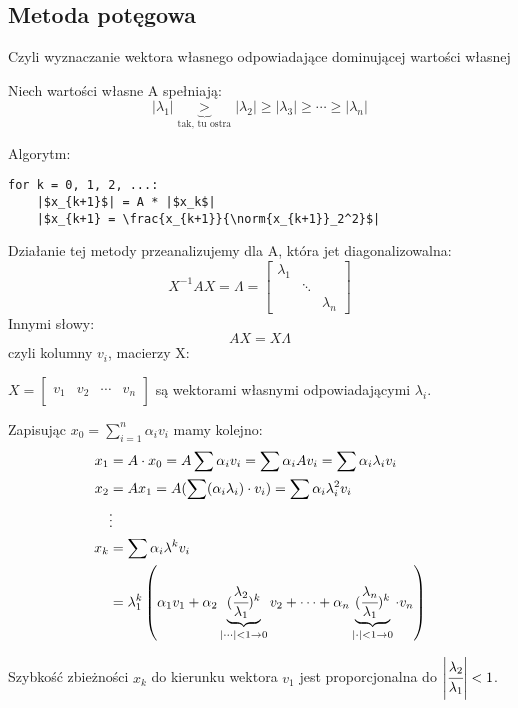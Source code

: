 \documentclass[hidelinks,a4paper,fleqn,oneside]{book}
\newcommand{\RR}{\mathbb{R}}
\newcommand{\CC}{\mathbb{C}}
\newcommand{\ra}{\rightarrow}
\newcommand{\norm}[1]{\left\lVert#1\right\rVert}
\begin{document}
\subsection{Metoda potęgowa}
Czyli wyznaczanie wektora własnego odpowiadające dominującej wartości własnej

Niech wartości własne A spełniają:
\[
	|\lambda_1| \underbrace{>}_{\textrm{tak, tu ostra}} |\lambda_2| \geq |\lambda_3| \geq \cdots \geq |\lambda_n|
\]

Algorytm:
\begin{verbatim}
for k = 0, 1, 2, ...:
    |$x_{k+1}$| = A * |$x_k$|
    |$x_{k+1} = \frac{x_{k+1}}{\norm{x_{k+1}}_2^2}$|
\end{verbatim}
Działanie tej metody przeanalizujemy dla A, która jet diagonalizowalna:
\[
	X^{-1} A X = \Lambda = \begin{bmatrix} \lambda_1 &  & \\  &  \ddots & \\ &  & \lambda_n \end{bmatrix}
\]
Innymi słowy:
\[
	AX = X \Lambda
\]
czyli kolumny $v_i$, macierzy X:
 
$X = \left[ \begin{array}{c|c|c|c} &&& \\ v_1 & v_2 & \cdots & v_n \\ &&& \end{array} \right]$ są wektorami własnymi odpowiadającymi $\lambda_i$.
 
Zapisując $x_0 = \sum_{i=1}^{n} \alpha_i v_i$ mamy kolejno:
\begin{align*}
	x_1 & = A \cdot x_0 = A \sum \alpha_iv_i = \sum \alpha_i Av_i = \sum \alpha_i \lambda_i v_i \\
	x_2 & = Ax_1 = A(\sum(\alpha_i\lambda_i)\cdot v_i) = \sum \alpha_i \lambda_i^2 v_i \\
	& \vdots \\
	x_k & = \sum \alpha_i \lambda^k v_i \\ & = \lambda_1^k\left(\alpha_1 v_1 + \alpha_2\underbrace{(\cfrac{\lambda_2}{\lambda_1})^k}_{| \cdots | < 1 \ra 0} v_2 + \cdots + \alpha_n \underbrace{(\cfrac{\lambda_n}{\lambda_1})^k}_{| \cdot | < 1 \ra 0} \cdot v_n\right)
\end{align*}
 
Szybkość zbieżności $x_k$ do kierunku wektora $v_1$ jest proporcjonalna do $\left| \cfrac{\lambda_2}{\lambda_1} \right| < 1$.
 
%
\end{document}
